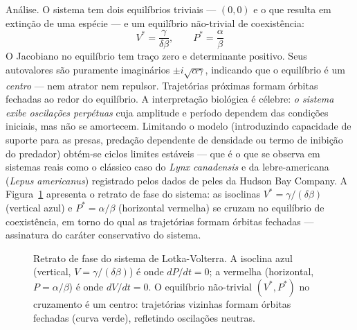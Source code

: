 Análise. O sistema tem dois equilíbrios triviais --- $(0,0)$ e o que resulta
em extinção de uma espécie --- e um equilíbrio não-trivial de coexistência:
\begin{equation}
V^* = \frac{\gamma}{\delta \beta}, \qquad P^* = \frac{\alpha}{\beta}
\end{equation}
O Jacobiano no equilíbrio tem traço zero e determinante positivo. Seus
autovalores são puramente imaginários $\pm i \sqrt{\alpha \gamma}$, indicando
que o equilíbrio é um \emph{centro} --- nem atrator nem repulsor. Trajetórias
próximas formam órbitas fechadas ao redor do equilíbrio. A interpretação
biológica é célebre: \emph{o sistema exibe oscilações perpétuas} cuja amplitude
e período dependem das condições iniciais, mas não se amortecem. Limitando o
modelo (introduzindo capacidade de suporte para as presas, predação
dependente de densidade ou termo de inibição do predador) obtém-se ciclos
limites estáveis --- que é o que se observa em sistemas reais como o clássico
caso do \emph{Lynx canadensis} e da lebre-americana (\textit{Lepus americanus})
registrado pelos dados de peles da Hudson Bay Company. A
Figura~\ref{fig:10-lv-fase} apresenta o retrato de fase do sistema: as
isoclinas $V^* = \gamma/(\delta\beta)$ (vertical azul) e $P^* = \alpha/\beta$
(horizontal vermelha) se cruzam no equilíbrio de coexistência, em torno do
qual as trajetórias formam órbitas fechadas --- assinatura do caráter
conservativo do sistema.

\begin{figure}[htbp]
\centering
{}
\caption{Retrato de fase do sistema de Lotka-Volterra. A isoclina azul (vertical, $V = \gamma/(\delta\beta)$) é onde $dP/dt = 0$; a vermelha (horizontal, $P = \alpha/\beta$) é onde $dV/dt = 0$. O equilíbrio não-trivial $(V^*, P^*)$ no cruzamento é um centro: trajetórias vizinhas formam órbitas fechadas (curva verde), refletindo oscilações neutras.}
\label{fig:10-lv-fase}
\end{figure}

